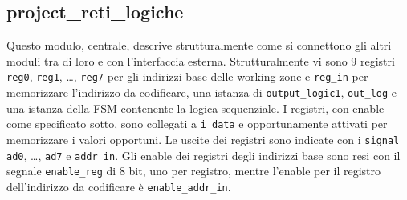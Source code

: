 \documentclass [a4paper, 12pt]{article}
\begin{document}
\subsection{project\_reti\_logiche}
Questo modulo, centrale, descrive strutturalmente come si connettono gli altri moduli tra di loro e con l'interfaccia esterna. Strutturalmente vi sono 9 registri \texttt{reg0}, \texttt{reg1}, \dots, \texttt{reg7} per gli indirizzi base delle working zone e \texttt{reg\_in} per memorizzare l'indirizzo da codificare, una istanza di \texttt{output\_logic1}, \texttt{out\_log} e una istanza della FSM contenente la logica sequenziale. I registri, con enable come specificato sotto, sono collegati a \texttt{i\_data} e opportunamente attivati per memorizzare i valori opportuni. Le uscite dei registri sono indicate con i \texttt{signal} \texttt{ad0}, \dots, \texttt{ad7} e \texttt{addr\_in}. Gli enable dei registri degli indirizzi base sono resi con il segnale \texttt{enable\_reg} di 8 bit, uno per registro, mentre l'enable per il registro dell'indirizzo da codificare \`e \texttt{enable\_addr\_in}. 
\end{document}
